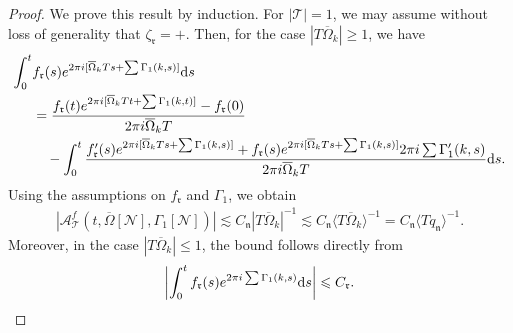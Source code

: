 \documentclass[UTF-8,reqno]{amsart}
\numberwithin{equation}{section}
\theoremstyle{definition}
\def\dif{{\mathord{{\rm d}}}}
\def\geq{\geqslant}
\def\leq{\leqslant}
\def\dif{{\mathord{{\rm d}}}}
\def\geq{\geqslant}
\def\leq{\leqslant}
\begin{document}
\begin{proof}
  We prove this result by induction.
For $|\mathcal{T}|=1$, we may assume without loss of generality that $\zeta_\mathfrak{r}=+$. Then, for the case $|T\overline\Omega_k|\geq 1$, we have
   \begin{align*}
        \int_0^t &  f_{\mathfrak{r}}(s)e^{ 2\pi i[\overline\Omega_kTs+\sum\Gamma_1(k,s)] } \dif s\\
        &= \frac{f_{\mathfrak{r}}(t)e^{ 2\pi i[\overline\Omega_kTt+\sum\Gamma_1(k,t)] }- f_{\mathfrak{r}}(0)}{2\pi i\overline\Omega_kT}\\
        &\quad - \int_0^t \frac{f'_{\mathfrak{r}}(s)e^{ 2\pi i[\overline\Omega_kTs+\sum\Gamma_1(k,s)] }+f_{\mathfrak{r}}(s)e^{ 2\pi i[\overline\Omega_kTs+\sum\Gamma_1(k,s)] }2\pi i\sum \Gamma_1'(k,s)}{2\pi i\overline\Omega_kT}   \dif s.
   \end{align*}
  Using the assumptions on $f_{\mathfrak{r}}$ and $\Gamma_1$, we obtain 
  \begin{align*}
    |\mathcal{A}^f_{\mathcal{T}}(t,\overline\Omega[\mathcal{N}],\Gamma_1[\mathcal{N}])|\lesssim C_\mathfrak{n}| T\overline\Omega_k|^{-1}\lesssim C_\mathfrak{n}\langle T\overline\Omega_k\rangle^{-1}= C_\mathfrak{n}\langle Tq_\mathfrak{n}\rangle^{-1}.
\end{align*}
Moreover, in the case $|T\overline\Omega_k|\leq 1$, the bound follows directly from
   \begin{align*}
      \left|  \int_0^t   f_{\mathfrak{r}}(s)e^{ 2\pi i \sum\Gamma_1(k,s) } \dif s\right|\leq C_{\mathfrak{r}}.
   \end{align*}


\end{proof}
\end{document}
